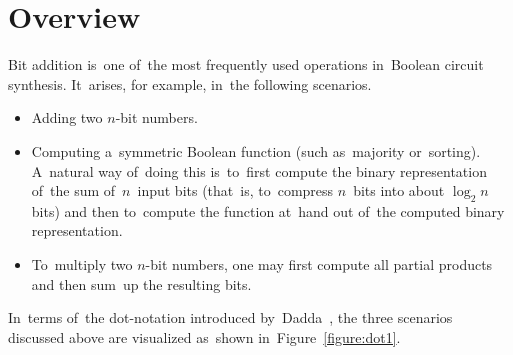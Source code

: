 \documentclass[sigconf, review, anonymous]{acmart}
\DeclareMathOperator{\SUM}{SUM}
\begin{document}
\section{Overview}

Bit addition is~one of~the most frequently used operations
in~Boolean circuit synthesis. It~arises, for example, in~the
following scenarios.
\begin{itemize}
	\item Adding two $n$-bit numbers.
	\item Computing a~symmetric Boolean function 
		(such as~majority or~sorting).
		A~natural way of~doing this is~to~first compute
		the binary representation of~the sum of~$n$~input bits
		(that~is, to~compress $n$~bits into about $\log_2 n$ bits)
		and then to~compute the function at~hand
		out of~the computed binary representation.
	\item To~multiply two $n$-bit numbers, one may first compute
		all partial products and then sum~up the resulting bits.
\end{itemize}
In~terms of~the dot-notation introduced by~Dadda~\cite{dadda}, the three scenarios discussed above are visualized as~shown in~Figure~\ref{figure:dot1}.
\end{document}

